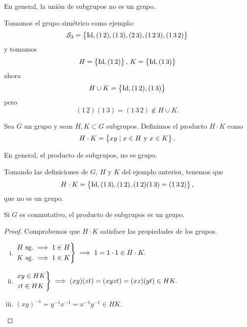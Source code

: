 \begin{obs}
    En general, la unión de subgrupos no es un grupo.
\end{obs}

\begin{example}
    Tomamos el grupo simétrico como ejemplo:
    \[
        \mathcal{S}_3 = \left\{ \operatorname{Id}, (1 \, 2), (1 \, 3), (2 \, 3), (1 \, 2 \, 3), (1 \, 3 \, 2)\right\}
    \]
    y tomamos
    \[
        H = \left\{\operatorname{Id}, (1 \, 2)\right\}, \, K = \left\{\operatorname{Id}, (1 \, 3)\right\}
    \]
    ahora
    \[
        H \cup K = \left\{\operatorname{Id}, (1 \, 2), (1\, 3)\right\}
    \]
    pero
    \[
        (1 \, 2)(1 \, 3) = (1 \, 3 \, 2) \notin H \cup K.
    \]
\end{example}

\begin{defi}
    Sea $G$ un grupo y sean $H, K \subset G$ subgrupos. Definimos el producto $H \cdot K$ como
    \[
        H \cdot K = \left\{xy \mid x \in H \text{ y } x \in K\right\}.
    \]
\end{defi}

\begin{obs}
    En general, el producto de subgrupos, no es grupo.
\end{obs}

\begin{example}
    Tomando las definiciones de $G$, $H$ y $K$ del ejemplo anterior, tenemos que
    \[
        H \cdot K = \left\{\operatorname{Id}, (1 \, 3), (1 \, 2), (1 \, 2)(1 \, 3) = (1 \, 3 \, 2)\right\},
    \]
    que no es un grupo.
\end{example}

\begin{obs}
    Si $G$ es conmutativo, el producto de subgrupos es un grupo.
\end{obs}

\begin{proof}
    Comprobemos que $H \cdot K$ satisface las propiedades de los grupos.
    \begin{enumerate}[i)]
        \item 
            $
                \begin{rcases}
                    H \text{ sg.} \implies 1 \in H \\
                    K \text{ sg.} \implies 1 \in K
                \end{rcases}
                \implies 1 = 1\cdot 1 \in H \cdot K.
            $
        \item
            $
                \begin{rcases}
                    xy \in HK \\
                    zt \in HK
                \end{rcases}
                \implies (xy)(zt) = (xyzt) = (xz)(yt) \in HK.
            $
        \item
            $
                (xy)^{-1} = y^{-1} x^{-1} = x^{-1}y^{-1} \in HK.
            $
    \end{enumerate}
\end{proof}

